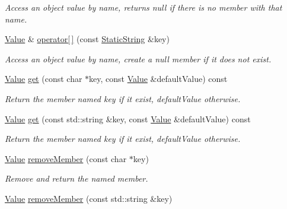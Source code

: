 \begin{DoxyCompactItemize}
\begin{DoxyCompactList}\small\item\em Access an object value by name, returns null if there is no member with that name. \end{DoxyCompactList}\item 
\hyperlink{class_json_1_1_value}{Value} \& \hyperlink{class_json_1_1_value_ac3763d7d315ca65dc188e273722f7955}{operator\mbox{[}$\,$\mbox{]}} (const \hyperlink{class_json_1_1_static_string}{Static\-String} \&key)
\begin{DoxyCompactList}\small\item\em Access an object value by name, create a null member if it does not exist. \end{DoxyCompactList}\item 
\hypertarget{class_json_1_1_value_ab76b3323cde14c7db20676d07b260ce7}{\hyperlink{class_json_1_1_value}{Value} \hyperlink{class_json_1_1_value_ab76b3323cde14c7db20676d07b260ce7}{get} (const char $\ast$key, const \hyperlink{class_json_1_1_value}{Value} \&default\-Value) const }\label{class_json_1_1_value_ab76b3323cde14c7db20676d07b260ce7}

\begin{DoxyCompactList}\small\item\em Return the member named key if it exist, default\-Value otherwise. \end{DoxyCompactList}\item 
\hypertarget{class_json_1_1_value_a54a34264356e01ee9c21a75ccfc809e9}{\hyperlink{class_json_1_1_value}{Value} \hyperlink{class_json_1_1_value_a54a34264356e01ee9c21a75ccfc809e9}{get} (const std\-::string \&key, const \hyperlink{class_json_1_1_value}{Value} \&default\-Value) const }\label{class_json_1_1_value_a54a34264356e01ee9c21a75ccfc809e9}

\begin{DoxyCompactList}\small\item\em Return the member named key if it exist, default\-Value otherwise. \end{DoxyCompactList}\item 
\hyperlink{class_json_1_1_value}{Value} \hyperlink{class_json_1_1_value_aa52f7873b95d29627d6e83ba96f69aaa}{remove\-Member} (const char $\ast$key)
\begin{DoxyCompactList}\small\item\em Remove and return the named member. \end{DoxyCompactList}\item 
\hypertarget{class_json_1_1_value_ae1f95f7ca3906e6bcc2a7be93210ecba}{\hyperlink{class_json_1_1_value}{Value} \hyperlink{class_json_1_1_value_ae1f95f7ca3906e6bcc2a7be93210ecba}{remove\-Member} (const std\-::string \&key)}\label{class_json_1_1_value_ae1f95f7ca3906e6bcc2a7be93210ecba}


\end{DoxyCompactItemize}
